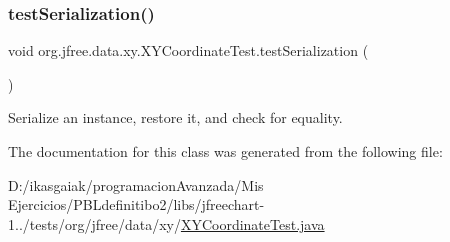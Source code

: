 \subsubsection{\texorpdfstring{test\+Serialization()}{testSerialization()}}
{\footnotesize\ttfamily void org.\+jfree.\+data.\+xy.\+X\+Y\+Coordinate\+Test.\+test\+Serialization (\begin{DoxyParamCaption}{ }\end{DoxyParamCaption})}

Serialize an instance, restore it, and check for equality. 

The documentation for this class was generated from the following file\+:\begin{DoxyCompactItemize}
\item 
D\+:/ikasgaiak/programacion\+Avanzada/\+Mis Ejercicios/\+P\+B\+Ldefinitibo2/libs/jfreechart-\/1../tests/org/jfree/data/xy/\mbox{\hyperlink{_x_y_coordinate_test_8java}{X\+Y\+Coordinate\+Test.\+java}}\end{DoxyCompactItemize}

